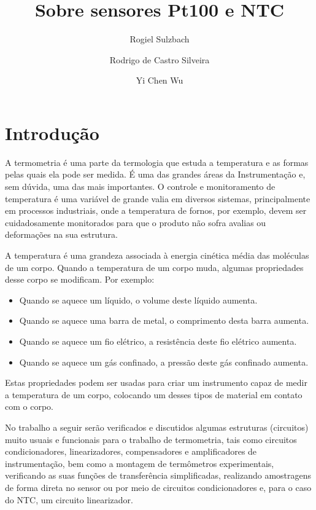 \documentclass[a4paper]{instrumentacao}
\title{Sobre sensores Pt100 e NTC}
\author{Rogiel Sulzbach \and Rodrigo de Castro Silveira \and Yi Chen Wu}
\institute{Universidade Federal do Rio Grande do Sul, Departamento de Engenharia Elétrica, Curso de Engenharia Elétrica, Instrumentação A, Profs. Dr. Alexandre Balbinot e Dra. Léia Bagesteiro}
\begin{document}
\fontsize{13pt}{15pt}\selectfont

\maketitle



\chapter{Introdução}
A termometria é uma parte da termologia que estuda a temperatura e as formas pelas quais ela pode ser medida. É uma das grandes áreas da Instrumentação e, sem dúvida, uma das mais importantes. O controle e monitoramento de temperatura é uma variável de grande valia em diversos sistemas, principalmente em processos industriais, onde a temperatura de fornos, por exemplo, devem ser cuidadosamente monitorados para que o produto não sofra avalias ou deformações na sua estrutura.

A temperatura é uma grandeza associada à energia cinética média das moléculas de um corpo. Quando a temperatura de um corpo muda, algumas propriedades desse corpo se modificam. Por exemplo:

\begin{itemize}
	\item Quando se aquece um líquido, o volume deste líquido aumenta.
	\item Quando se aquece uma barra de metal, o comprimento desta barra aumenta.
	\item Quando se aquece um fio elétrico, a resistência deste fio elétrico aumenta.
	\item Quando se aquece um gás confinado, a pressão deste gás confinado aumenta.
\end{itemize}

Estas propriedades podem ser usadas para criar um instrumento capaz de medir a temperatura de um corpo, colocando um desses tipos de material em contato com o corpo.

No trabalho a seguir serão verificados e discutidos algumas estruturas (circuitos) muito usuais e funcionais para o trabalho de termometria, tais como circuitos condicionadores, linearizadores, compensadores e amplificadores de instrumentação, bem como a montagem de termômetros experimentais, verificando as suas funções de transferência simplificadas, realizando amostragens de forma direta no sensor ou por meio de circuitos condicionadores e, para o caso do NTC, um circuito linearizador.
\end{document}

